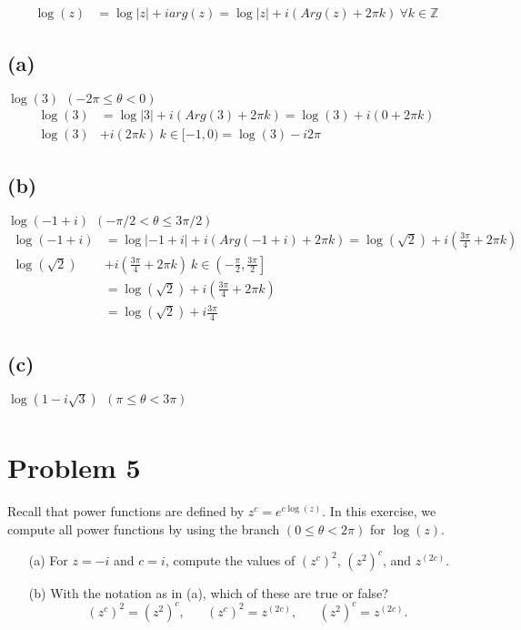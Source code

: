\documentclass{article}
\begin{document}
\begin{align*}
  \log(z) &= \log{|z|} + iarg(z) = \log{|z|} + i(Arg(z) + 2\pi k)\ \forall k \in \mathbb{Z}
\end{align*}
\subsection*{(a)}
$ \log{(3)} \ \ (-2\pi \leq \theta < 0)$
\begin{align*}
  \log{(3)} &=  \log{|3|} + i(Arg(3) + 2\pi k)= \log{(3)} + i(0 +  2\pi k)\\
  \log{(3)} &+ i(2\pi k)\ k \in [-1,0) = \log{(3)} - i2\pi
\end{align*}
\subsection*{(b)}
$ \log(-1 + i) \ \ (-\pi/2 < \theta \leq 3 \pi / 2)$
\begin{align*}
  \log{(-1 + i)} &=  \log{|-1 + i|} + i(Arg(-1 + i) + 2\pi k)= \log{(\sqrt{2})} + i\left(\frac{3\pi}{4} +  2\pi k\right)\\
  \log{(\sqrt{2})} &+ i\left(\frac{3\pi}{4}+2\pi k\right)\ k \in \left(-\frac{\pi}{2}, \frac{3\pi}{2}\right]\\
                 &= \log{(\sqrt{2})} + i\left(\frac{3\pi}{4}+2\pi k\right) \\
                 &= \log{(\sqrt{2})} + i\frac{3\pi}{4}
\end{align*}
\subsection*{(c)}
$ \log(1 - i \sqrt 3) \ \ (\pi \leq \theta < 3 \pi)$
\begin{align*}
  
\end{align*}
\newpage
\section*{Problem 5}
Recall that power functions are defined by $z^c = e^{c \log(z)}$. In this exercise, we compute all power functions by using the branch $(0 \leq \theta < 2 \pi)$ for $\log(z)$.
\begin{enumerate}
	\item [(a)] For $z = -i$ and $c = i$, compute the values of $(z^c)^2$, $(z^2)^c$, and $z^{(2c)}$.
	\item [(b)] With the notation as in (a), which of these are true or false?
	      $$ (z^c)^2 = (z^2)^c, \hspace{20pt} (z^c)^2 = z^{(2c)}, \hspace{20pt} (z^2)^c = z^{(2c)}.$$

\end{enumerate}
\end{document}

